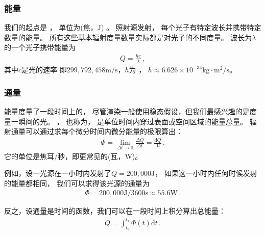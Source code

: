 \subsubsection*{能量}
我们的起点是
，
单位为(焦，J)
。
照射源发射，
每个光子有特定波长并携带特定数量的能量。
所有这些基本辐射度量数量实际都是对光子的不同度量。
波长为$\lambda$的一个光子携带能量为
\begin{align*}
    Q=\frac{hc}{\lambda}\, ,
\end{align*}
其中$c$是光的速率
即$299,792,458\text{m}/\text{s}$，$h$为
，
$h\approx6.626\times10^{-34}\text{kg}\cdot\text{m}^2/\text{s}$。

\subsubsection*{通量}
能量度量了一段时间上的，
尽管渲染一般使用稳态假设，但我们最感兴趣的是度量一瞬间的光。
，
也称为，
是单位时间内穿过表面或空间区域的能量总量。
辐射通量可以通过求每个微分时间内微分能量的极限算出：
\begin{align*}
    \varPhi=\lim\limits_{\Delta t\rightarrow 0}{\frac{\Delta Q}{\Delta t}}=\frac{\mathrm{d}Q}{\mathrm{d}t}\, .
\end{align*}
它的单位是焦耳$/$秒，即更常见的(瓦，W)。

例如，设一光源在一小时内发射了$Q=200,000\text{J}$，
如果这一小时内任何时候发射的能量都相同，
我们可以求得该光源的通量为
\begin{align*}
    \varPhi=200,000\text{J}/3600\text{s}\approx 55.6\text{W}\, .
\end{align*}

反之，设通量是时间的函数，我们可以在一段时间上积分算出总能量：
\begin{align*}
    Q=\int_{t_0}^{t_1}\varPhi(t)\mathrm{d}t\, .
\end{align*}

